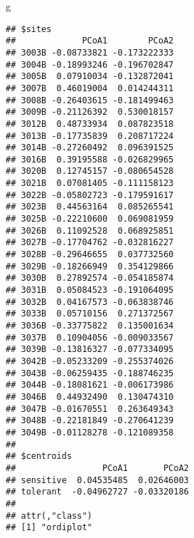 \documentclass[
]{article}
\newenvironment{Shaded}{\begin{snugshade}}{\end{snugshade}}
\newcommand{\FloatTok}[1]{\textcolor[rgb]{0.00,0.00,0.81}{#1}}
\newcommand{\FunctionTok}[1]{\textcolor[rgb]{0.00,0.00,0.00}{#1}}
\newcommand{\NormalTok}[1]{#1}
\newcommand{\OtherTok}[1]{\textcolor[rgb]{0.56,0.35,0.01}{#1}}
\newcommand{\SpecialCharTok}[1]{\textcolor[rgb]{0.00,0.00,0.00}{#1}}
\newcommand{\StringTok}[1]{\textcolor[rgb]{0.31,0.60,0.02}{#1}}
\begin{document}
\begin{Shaded}
\begin{Highlighting}[]
\NormalTok{g}
\end{Highlighting}
\end{Shaded}

\begin{verbatim}
## $sites
##             PCoA1        PCoA2
## 3003B -0.08733821 -0.173222333
## 3004B -0.18993246 -0.196702847
## 3005B  0.07910034 -0.132872041
## 3007B  0.46019004  0.014244311
## 3008B -0.26403615 -0.181499463
## 3009B -0.21126392  0.530018157
## 3012B  0.48733934  0.087823518
## 3013B -0.17735839  0.208717224
## 3014B -0.27260492  0.096391525
## 3016B  0.39195588 -0.026829965
## 3020B  0.12745157 -0.080654528
## 3021B  0.07081405 -0.111158123
## 3022B -0.05802723 -0.179591617
## 3023B  0.44563164  0.085265541
## 3025B -0.22210600  0.069081959
## 3026B  0.11092528  0.068925851
## 3027B -0.17704762 -0.032816227
## 3028B -0.29646655  0.037732560
## 3029B -0.18266949  0.354129866
## 3030B  0.27892574 -0.054185874
## 3031B  0.05084523 -0.191064095
## 3032B  0.04167573 -0.063838746
## 3033B  0.05710156  0.271372567
## 3036B -0.33775822  0.135001634
## 3037B  0.10904056 -0.009033567
## 3039B -0.13816327 -0.077334095
## 3042B -0.05233209 -0.255374026
## 3043B -0.06259435 -0.188746235
## 3044B -0.18081621 -0.006173986
## 3046B  0.44932490  0.130474310
## 3047B -0.01670551  0.263649343
## 3048B -0.22181849 -0.270641239
## 3049B -0.01128278 -0.121089358
## 
## $centroids
##                 PCoA1       PCoA2
## sensitive  0.04535485  0.02646003
## tolerant  -0.04962727 -0.03320186
## 
## attr(,"class")
## [1] "ordiplot"
\end{verbatim}

\begin{Shaded}
\end{Shaded}
\end{document}

